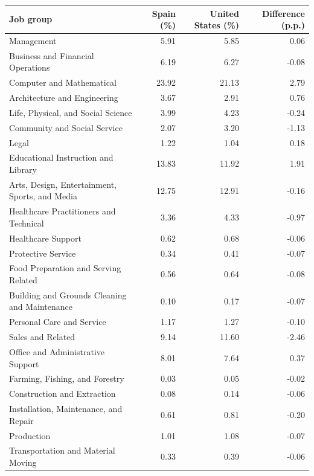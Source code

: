 \begin{tabular}{lrrr}
\toprule
Job group & Spain (\%) & United States (\%) & Difference (p.p.) \\
\midrule
Management & 5.91 & 5.85 & 0.06 \\
Business and Financial Operations & 6.19 & 6.27 & -0.08 \\
Computer and Mathematical & 23.92 & 21.13 & 2.79 \\
Architecture and Engineering & 3.67 & 2.91 & 0.76 \\
Life, Physical, and Social Science & 3.99 & 4.23 & -0.24 \\
Community and Social Service & 2.07 & 3.20 & -1.13 \\
Legal & 1.22 & 1.04 & 0.18 \\
Educational Instruction and Library & 13.83 & 11.92 & 1.91 \\
Arts, Design, Entertainment, Sports, and Media & 12.75 & 12.91 & -0.16 \\
Healthcare Practitioners and Technical & 3.36 & 4.33 & -0.97 \\
Healthcare Support & 0.62 & 0.68 & -0.06 \\
Protective Service & 0.34 & 0.41 & -0.07 \\
Food Preparation and Serving Related & 0.56 & 0.64 & -0.08 \\
Building and Grounds Cleaning and Maintenance & 0.10 & 0.17 & -0.07 \\
Personal Care and Service & 1.17 & 1.27 & -0.10 \\
Sales and Related & 9.14 & 11.60 & -2.46 \\
Office and Administrative Support & 8.01 & 7.64 & 0.37 \\
Farming, Fishing, and Forestry & 0.03 & 0.05 & -0.02 \\
Construction and Extraction & 0.08 & 0.14 & -0.06 \\
Installation, Maintenance, and Repair & 0.61 & 0.81 & -0.20 \\
Production & 1.01 & 1.08 & -0.07 \\
Transportation and Material Moving & 0.33 & 0.39 & -0.06 \\
\bottomrule
\end{tabular}
